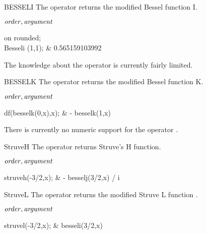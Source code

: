 \begin{Operator}{BESSELI}
The  operator returns the modified Bessel function I.

\begin{Syntax}
\(\meta{order},\meta{argument}\)
\end{Syntax}

\begin{Examples}
on rounded; \\
Besseli (1,1);                  &      0.565159103992
\end{Examples}

\begin{Comments}
The knowledge about the operator  is currently fairly limited.
\end{Comments}
\end{Operator}

\begin{Operator}{BESSELK}
The  operator returns the modified Bessel function K.

\begin{Syntax}
\(\meta{order},\meta{argument}\)
\end{Syntax}

\begin{Examples}
df(besselk(0,x),x);            &    - besselk(1,x)
\end{Examples}

\begin{Comments}
There is currently no numeric support for the operator .
\end{Comments}
\end{Operator}

\begin{Operator}{StruveH}
The  operator returns Struve's H function.

\begin{Syntax}
\(\meta{order},\meta{argument}\)
\end{Syntax}

\begin{Examples}
struveh(-3/2,x);               &    - besselj(3/2,x) / i
\end{Examples}

\end{Operator}

\begin{Operator}{StruveL}
The  operator returns the modified Struve L function .

\begin{Syntax}
\(\meta{order},\meta{argument}\)
\end{Syntax}

\begin{Examples}
struvel(-3/2,x);               &    besseli(3/2,x)
\end{Examples}

\end{Operator}

